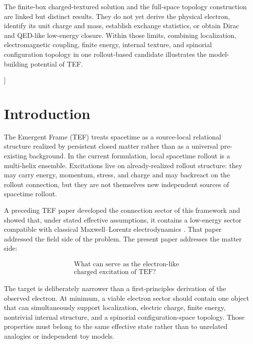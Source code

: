 \documentclass[11pt]{article}
\begin{document}
\begin{@twocolumnfalse}
The finite-box charged-textured solution and the full-space topology construction are linked but distinct results. They do not yet derive the physical electron, identify its unit charge and mass, establish exchange statistics, or obtain Dirac and QED-like low-energy closure. Within those limits, combining localization, electromagnetic coupling, finite energy, internal texture, and spinorial configuration topology in one rollout-based candidate illustrates the model-building potential of TEF.
\endgroup
\vspace{1.15em}
\end{@twocolumnfalse}
]
\begingroup
\renewcommand{\thefootnote}{\fnsymbol{footnote}}
\endgroup

\section{Introduction}

The Emergent Frame (TEF) treats spacetime as a source-local relational structure realized by persistent closed matter rather than as a universal pre-existing background. In the current formulation, local spacetime rollout is a multi-helix ensemble. Excitations live on already-realized rollout structure: they may carry energy, momentum, stress, and charge and may backreact on the rollout connection, but they are not themselves new independent sources of spacetime rollout.

A preceding TEF paper developed the connection sector of this framework and showed that, under stated effective assumptions, it contains a low-energy sector compatible with classical Maxwell--Lorentz electrodynamics \cite{WuEM2026}. That paper addressed the field side of the problem. The present paper addresses the matter side:

\begin{equation}
\boxed{
\begin{gathered}
\text{What can serve as the electron-like}\\
\text{charged excitation of TEF?}
\end{gathered}
}
\end{equation}

The target is deliberately narrower than a first-principles derivation of the observed electron. At minimum, a viable electron sector should contain one object that can simultaneously support localization, electric charge, finite energy, nontrivial internal structure, and a spinorial configuration-space topology. Those properties must belong to the same effective state rather than to unrelated analogies or independent toy models.
\end{document}
